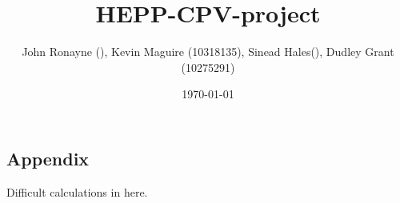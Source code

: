 \documentclass[floatfix,aps,prd,amsmath,amssymb]{revtex4}
\begin{document}
\title{HEPP-CPV-project}
\author{John Ronayne (), Kevin Maguire (10318135), Sinead Hales(), Dudley Grant (10275291)}
\date{\today}

\begin{abstract}
\textit{}
\end{abstract}

\maketitle
{}
 










%


\begin{appendix}
\section{Appendix}
Difficult calculations in here.
\end{appendix}
 
\end{document}

